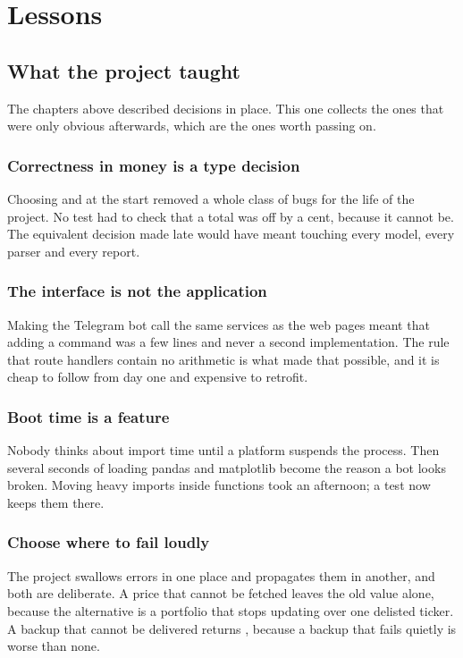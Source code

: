 \chapter{Lessons}

\section{What the project taught}

The chapters above described decisions in place. This one collects the ones that
were only obvious afterwards, which are the ones worth passing on.

\subsection{Correctness in money is a type decision}

Choosing  and  at the start removed a whole class of
bugs for the life of the project. No test had to check that a total was off by a
cent, because it cannot be. The equivalent decision made late would have meant
touching every model, every parser and every report.

\subsection{The interface is not the application}

Making the Telegram bot call the same services as the web pages meant that
adding a command was a few lines and never a second implementation. The rule
that route handlers contain no arithmetic is what made that possible, and it is
cheap to follow from day one and expensive to retrofit.

\subsection{Boot time is a feature}

Nobody thinks about import time until a platform suspends the process. Then
several seconds of loading pandas and matplotlib become the reason a bot looks
broken. Moving heavy imports inside functions took an afternoon; a test now
keeps them there.

\subsection{Choose where to fail loudly}

The project swallows errors in one place and propagates them in another, and
both are deliberate. A price that cannot be fetched leaves the old value alone,
because the alternative is a portfolio that stops updating over one delisted
ticker. A backup that cannot be delivered returns , because a backup
that fails quietly is worse than none.

